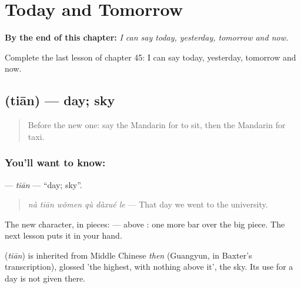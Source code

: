 
\chapter{Today and Tomorrow}
\label{ch:zh-today-and-tomorrow}

\begin{chapteropening}
\textbf{By the end of this chapter:} \emph{I can say today, yesterday, tomorrow and now.}

Complete the last lesson of chapter 45: I can say today, yesterday, tomorrow and now.
\end{chapteropening}

\section[\texorpdfstring{\zh{天} (tiān)}{天 (tiān)}]{ (tiān) — day; sky}

\label{lesson:ZH-C45-tian}



\begin{quote}
Before the new one: say the Mandarin for to sit, then the Mandarin for taxi.
\end{quote}

\subsection*{You'll want to know: }
\textbf{} — \emph{tiān} — \textquotedblleft{}day; sky\textquotedblright{}.

\begin{quote}
\textbf{} \emph{nà tiān wǒmen qù dàxué le} — That day we went to the university.
\end{quote}

The new character, in pieces:  —  above : one more bar over the big piece. The next lesson puts it in your hand.

\begin{cousinweb}
\textbf{} (\emph{tiān}) is inherited from Middle Chinese \emph{then} (Guangyun, in Baxter's transcription), glossed 'the highest, with nothing above it', the sky. Its use for a day is not given there.
\end{cousinweb}

